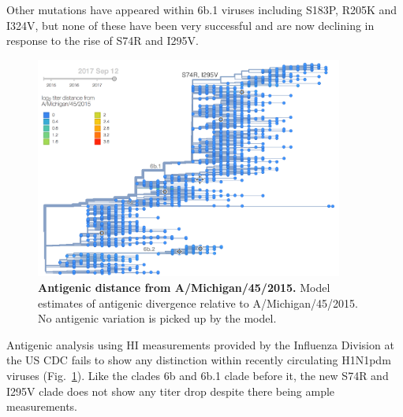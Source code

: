 \documentclass[11pt,oneside,letterpaper]{article}
\newcommand{\FIG}[1]{Fig.~\ref{#1}}
\begin{document}
Other mutations have appeared within 6b.1 viruses including S183P, R205K
and I324V, but none of these have been very successful and are now
declining in response to the rise of S74R and I295V.

\clearpage
\begin{figure}[H]
  \centering
  \includegraphics[width=0.9\textwidth]{../figures/sep-2017/h1n1pdm_tree_titer_model.png}
  \caption{\textbf{Antigenic distance from A/Michigan/45/2015.}
  Model estimates of antigenic divergence relative to A/Michigan/45/2015.
  No antigenic variation is picked up by the model.
  }
  \label{h1n1pdm_tree_titer_model}
\end{figure}
Antigenic analysis using HI measurements provided by the Influenza
Division at the US CDC fails to show any distinction within recently
circulating H1N1pdm viruses (\FIG{h1n1pdm_tree_titer_model}). Like the clades 6b and 6b.1 clade before
it, the new S74R and I295V clade does not show any titer drop despite
there being ample measurements.
\end{document}
